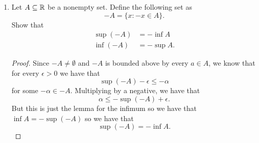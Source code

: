 \begin{enumerate}
            \begin{proof}
                Since \( A, B \neq \emptyset \) and bounded above, we can say that \( \sup A \) and \( \sup B \) exists. Label these supremum by the following \( \sup A = \alpha \) and \( \sup B = \beta \). By definition, we have that 
                \begin{align*}
                    x \leq \alpha, \text{ for all } x \in A  \\ 
                    y \leq \beta, \text{ for all } y \in B. 
                \end{align*}
                Multiplying these inequalities together, we have that 
            \[ xy \leq \alpha \beta \text{ for all } x \in A, y \in B. \]
            Hence, we have that \( \alpha\beta \in A \cdot B \) is an upper bound. 
            Now we want to show that \( \alpha \beta \in A \cdot B   \) is the least upper bound. For every \( \epsilon > 0 \), we have 
            \begin{align*}
                \alpha - \epsilon < a \leq \alpha \\ 
                \beta - \epsilon < b  \leq \beta
            \end{align*}
            for some \( a \in A \) and for some \( b \in B \). Multiplying these two quantities together we have that 
            \begin{align*}
                \alpha \beta - \epsilon( \alpha + \beta + \epsilon) \leq \alpha \beta.
            \end{align*} 
            Since we can make \( \epsilon' = \epsilon( \alpha + \beta + \epsilon) > 0 \) abirtrarly small so that \( \alpha \beta - \epsilon' \) is not an upper bound of \( A \cdot B \). Hence, we have that 
            \[ \sup (A \cdot B ) = \sup A \cdot \sup B. \]
            \end{proof}
           
		\item Let \( A \subseteq \mathbb{R} \) be a nonempty set. Define the following set as 
			\[ -A = \{  x: -x \in A \}. \]
			Show that 
			\begin{align*}
				\sup(-A ) &= - \inf A \\ 
				 \inf (-A ) &= -\sup A. 
			\end
            {align*}
           

        \begin{proof}
        Since \( - A \neq \emptyset \) and \( -A \) is bounded above by every \( a \in A \), we know that for every \( \epsilon  > 0 \) we have that 
        \[ \sup (-A) - \epsilon \leq - \alpha\]
        for some \( -\alpha \in -A \). Multiplying by a negative, we have that 
        \[\alpha \leq -\sup (-A) + \epsilon.\]
        But this is just the lemma for the infimum so we have that \( \inf A = - \sup (-A)\) so we have that \[ \sup (-A) = -\inf A .\] 


\end{proof}
\end{enumerate}
